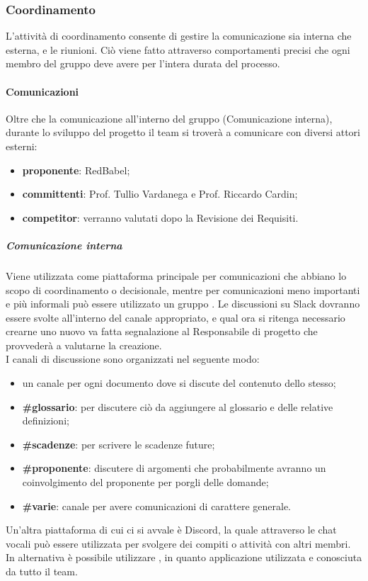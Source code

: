 \subsubsection{Coordinamento} \label{_gestioneDiProcesso_coordinamento}
L'attività di coordinamento consente di gestire la comunicazione sia interna che esterna, e le riunioni. Ciò viene fatto attraverso comportamenti precisi che ogni membro del gruppo deve avere per l'intera durata del processo.

\paragraph{Comunicazioni}
Oltre che la comunicazione all'interno del gruppo (Comunicazione interna), durante lo sviluppo del progetto il team si troverà a comunicare con diversi attori esterni:
\begin{itemize}
    \item \textbf{proponente}: RedBabel;
    \item \textbf{committenti}: Prof. Tullio Vardanega e Prof. Riccardo Cardin;
    \item \textbf{competitor}: verranno valutati dopo la Revisione dei Requisiti.
\end{itemize}

\subparagraph{Comunicazione interna}
Viene utilizzata come piattaforma principale  per comunicazioni che abbiano lo scopo di coordinamento o decisionale, mentre per comunicazioni meno importanti e più informali può essere utilizzato un gruppo .
Le discussioni su Slack dovranno essere svolte all'interno del canale appropriato, e qual ora si ritenga necessario crearne uno nuovo va fatta segnalazione al Responsabile di progetto che provvederà a valutarne la creazione.\\
I canali di discussione sono organizzati nel seguente modo:
\begin{itemize}
    \item un canale per ogni documento dove si discute del contenuto dello stesso;
    \item \textbf{\#glossario}: per discutere ciò da aggiungere al glossario e delle relative definizioni;
    \item \textbf{\#scadenze}: per scrivere le scadenze future;
    \item \textbf{\#proponente}: discutere di argomenti che probabilmente avranno un coinvolgimento del proponente per porgli delle domande;
    \item \textbf{\#varie}: canale per avere comunicazioni di carattere generale.
\end{itemize}
Un'altra piattaforma di cui ci si avvale è Discord, la quale attraverso le chat vocali può essere utilizzata per svolgere dei compiti o attività con altri membri. In alternativa è possibile utilizzare , in quanto applicazione utilizzata e conosciuta da tutto il team.

